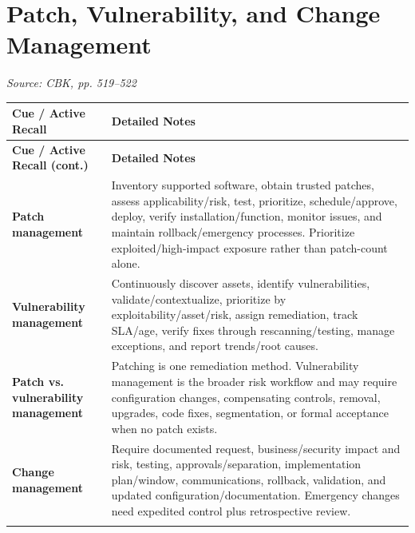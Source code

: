 \documentclass[10pt,letterpaper]{article}
\makeatletter
\newenvironment{cornell}{\rowcolors{2}{white}{notebg}\begin{longtable}{@{}>{\raggedright\arraybackslash\columncolor{cuebg}\color{navy}\bfseries}p{0.285\textwidth}>{\raggedright\arraybackslash}p{0.65\textwidth}@{}}\rowcolor{navy}\color{white}\textbf{Cue / Active Recall} & \color{white}\textbf{Detailed Notes}\\ \hline\endfirsthead\rowcolor{navy}\color{white}\textbf{Cue / Active Recall (cont.)} & \color{white}\textbf{Detailed Notes}\\ \hline\endhead}{\end{longtable}}
\newcommand{\noterow}[2]{#1 & #2\\\arrayrulecolor{line}\hline}\newcommand{\source}[1]{\par{\footnotesize\color{teal}\textit{Source: CBK, #1}}\par}
\makeatother
\begin{document}
\section{\color{navy}Patch, Vulnerability, and Change Management}
\source{pp. 519--522}
\begin{cornell}
\noterow{Patch management}{Inventory supported software, obtain trusted patches, assess applicability/risk, test, prioritize, schedule/approve, deploy, verify installation/function, monitor issues, and maintain rollback/emergency processes. Prioritize exploited/high-impact exposure rather than patch-count alone.}
\noterow{Vulnerability management}{Continuously discover assets, identify vulnerabilities, validate/contextualize, prioritize by exploitability/asset/risk, assign remediation, track SLA/age, verify fixes through rescanning/testing, manage exceptions, and report trends/root causes.}
\noterow{Patch vs. vulnerability management}{Patching is one remediation method. Vulnerability management is the broader risk workflow and may require configuration changes, compensating controls, removal, upgrades, code fixes, segmentation, or formal acceptance when no patch exists.}
\noterow{Change management}{Require documented request, business/security impact and risk, testing, approvals/separation, implementation plan/window, communications, rollback, validation, and updated configuration/documentation. Emergency changes need expedited control plus retrospective review.}
\end{cornell}
\end{document}
